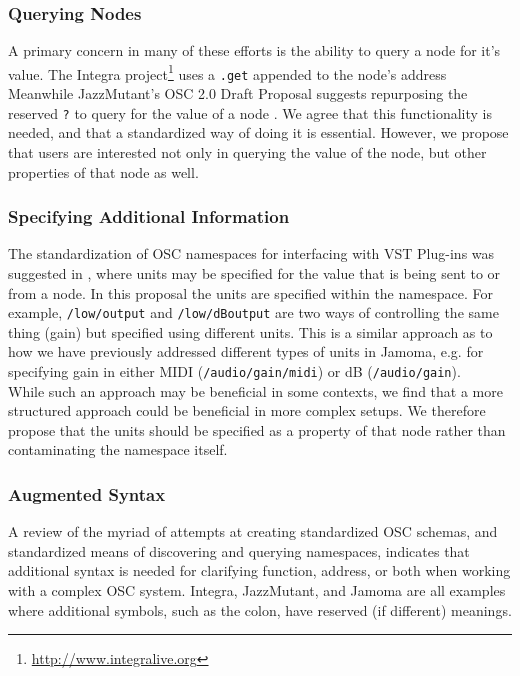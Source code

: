 \documentclass{NIME-alternate}
\begin{document}
\subsubsection{Querying Nodes}
A primary concern in many of these efforts is the ability to query a node for it's value. The Integra project\footnote{\url{http://www.integralive.org}} uses a \texttt{.get} appended to the node's address
Meanwhile JazzMutant's OSC 2.0 Draft Proposal suggests repurposing the reserved \texttt{?} to query for the value of a node %
\cite{Jazzmutant:2007}. We agree that this functionality is needed, and that a standardized way of doing it is essential.  However, we propose that users are interested not only in querying the value of the node, but other properties of that node as well.

\subsubsection{Specifying Additional Information}
The standardization of OSC namespaces for interfacing with VST Plug-ins was suggested in \cite{Zbyszynski:2005}, where units may be specified for the value that is being sent to or from a node.  In this proposal the units are specified within the namespace.  For example, \texttt{/low/output} and \texttt{/low/dBoutput} are two ways of controlling the same thing (gain) but specified using different units. This is a similar approach as to how we have previously addressed different types of units in Jamoma, e.g. for specifying gain in either MIDI (\texttt{/audio/gain/midi}) or dB (\texttt{/audio/gain}).\\ 
While such an approach may be beneficial in some contexts, we find that a more structured approach could be beneficial in more complex setups. We therefore propose that the units should be specified as a property of that node rather than contaminating the namespace itself.

\subsubsection{Augmented Syntax}

A review of the myriad of attempts at creating standardized OSC schemas, and standardized means of discovering and querying namespaces, indicates that additional syntax is needed for clarifying function, address, or both when working with a complex OSC system.  Integra, JazzMutant, and Jamoma are all examples where additional symbols, such as the colon, have reserved (if different) meanings.
\end{document}
